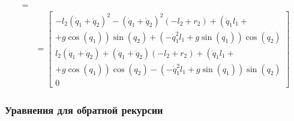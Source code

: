 \documentclass[a4paper,14pt]{extreport}
\begin{document}
\begin{itemize}
\begin{align*}
=\\
&=
\left[\begin{matrix}
- l_{2} \left(\dot{q}_1 + \dot{q}_2\right)^{2} - \left(\dot{q}_1 + \dot{q}_2\right)^{2} \left(- l_{2} + r_{2}\right) + \left(\ddot{q}_1 l_{1} \right.+\\+\left. g \cos{\left (q_{1} \right )}\right) \sin{\left (q_{2} \right )} + \left(- \dot{q}_1^{2} l_{1} + g \sin{\left (q_{1} \right )}\right) \cos{\left (q_{2} \right )}\\
l_{2} \left(\ddot{q}_1 + \ddot{q}_2\right) + \left(\ddot{q}_1 + \ddot{q}_2\right) \left(- l_{2} + r_{2}\right) + \left(\ddot{q}_1 l_{1} \right.+\\+\left. g \cos{\left (q_{1} \right )}\right) \cos{\left (q_{2} \right )} - \left(- \dot{q}_1^{2} l_{1} + g \sin{\left (q_{1} \right )}\right) \sin{\left (q_{2} \right )}\\0\end{matrix}
\right]
\end{align*}
\end{itemize}


\subsubsection{Уравнения для обратной рекурсии}
\end{document}
